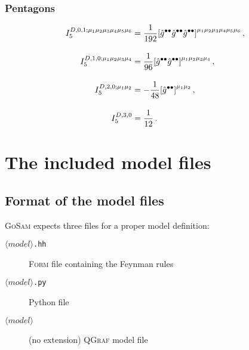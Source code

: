 \documentclass[11pt,a4paper]{refrep}
\newcommand{\gosamversion}{{3{.}0}}
\newcommand{\gosamv}[1][\gosamversion]{\textsc{GoSam}\xspace}
\newcommand{\qgraf}{\textsc{QGraf}\xspace}
\newcommand{\form}{\textsc{Form}\xspace}
\newcommand{\python}{{Python}\xspace}
\begin{document}
\subsection*{Pentagons}
\begin{subequations}
\begin{align}
  I_5^{D,0,1;\mu_1\mu_2\mu_3\mu_4\mu_5\mu_6} &= \frac{1}{192}\qty[\hat{g}^{\bullet\bullet}\hat{g}^{\bullet\bullet}\hat{g}^{\bullet\bullet}]^{\mu_1\mu_2\mu_3\mu_4\mu_5\mu_6}\,,\\[10pt]
%
  I_5^{D,1,0;\mu_1\mu_2\mu_3\mu_4} &= \frac{1}{96}\qty[\hat{g}^{\bullet\bullet}\hat{g}^{\bullet\bullet}]^{\mu_1\mu_2\mu_3\mu_4}\,,\\[10pt]
%
  I_5^{D,2,0;\mu_1\mu_2} &= -\frac{1}{48}\qty[\hat{g}^{\bullet\bullet}]^{\mu_1\mu_2}\,,\\[10pt]
%
  I_5^{D,3,0} &= \frac{1}{12}\,.
\end{align}
\end{subequations}

\chapter{The included model files}
\label{chp:model-files}

\section{Format of the model files}\label{sec:modelfiles}
\gosamv{} expects three files for a proper model definition:
\begin{description}
\item[$\langle model\rangle$\texttt{.hh}] \form{} file containing the Feynman rules
\item[$\langle model\rangle$\texttt{.py}] \python{} file
\item[$\langle model\rangle$] (no extension) \qgraf{} model file
\end{description}
\end{document}
